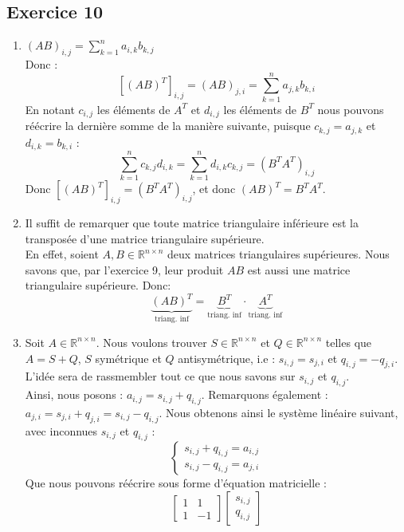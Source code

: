 \documentclass{article}
\newcommand{\R}{\mathbb{R}}
\newcommand{\cross}{\times}
\begin{document}
\subsection*{Exercice 10}
\begin{enumerate}
    \item $(AB)_{i,j}=\displaystyle\sum_{k=1}^{n}a_{i,k}b_{k,j}$ \\
    Donc :
    $$[(AB)^{T}]_{i,j}=(AB)_{j,i}=\sum_{k=1}^{n}a_{j,k}b_{k,i}$$
    En notant $c_{i,j}$ les éléments de $A^{T}$ et $d_{i,j}$ les éléments de $B^{T}$ nous pouvons réécrire la dernière somme de la manière suivante, puisque $c_{k,j} = a_{j,k}$ et $d_{i,k} = b_{k,i}$ :
    $$\sum_{k=1}^{n}c_{k,j}d_{i,k}=\sum_{k=1}^{n}d_{i,k}c_{k,j}=(B^{T}A^{T})_{i,j}$$
    Donc $[(AB)^T]_{i,j} = (B^T A^T)_{i,j}$, et donc $(AB)^T = B^T A^T$.
    \item Il suffit de remarquer que toute matrice triangulaire inférieure est la transposée d'une matrice triangulaire supérieure. \\
    En effet, soient $A,B \in \R^{n\cross n}$ deux matrices triangulaires supérieures. Nous savons que, par l'exercice 9, leur produit $AB$ est aussi une matrice triangulaire supérieure. Donc:
    $$\underbrace{(AB)^T}_{\text{triang. inf}} = \underbrace{B^T}_{\text{triang. inf}} \cdot  \underbrace{A^T}_{\text{triang. inf}}$$
    \item Soit $A \in \R^{n \cross n}$. Nous voulons trouver $S \in \R^{n \cross n}$ et $Q \in \R^{n \cross n}$ telles que $A = S+Q$, $S$ symétrique et $Q$ antisymétrique, i.e : $s_{i,j} = s_{j,i}$ et $q_{i,j} = -q_{j,i}$. L'idée sera de rassmembler tout ce que nous savons sur $s_{i,j}$ et $q_{i,j}$.\\
    Ainsi, nous posons : $a_{i,j} = s_{i,j} + q_{i,j}$. Remarquons également : $a_{j,i} = s_{j,i} + q_{j,i} = s_{i,j} - q_{i,j}$. Nous obtenons ainsi le système linéaire suivant, avec inconnues $s_{i,j}$ et $q_{i,j}$ :
    $$
    \begin{cases}
    s_{i,j} + q_{i,j} = a_{i,j}\\
    s_{i,j} - q_{i,j} = a_{j,i}
    \end{cases}
    $$
    Que nous pouvons réécrire sous forme d'équation matricielle :
    $$
    \begin{bmatrix}
    1 & 1\\
    1 & -1
    \end{bmatrix}\begin{bmatrix}
    s_{i,j} \\ q_{i,j}

\end{bmatrix}$$
\end{enumerate}
\end{document}
